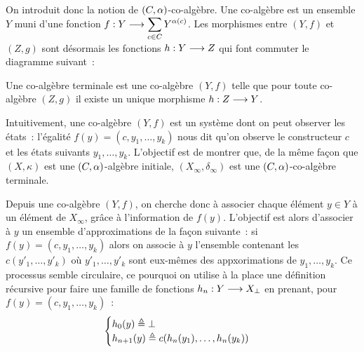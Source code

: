 \begin{problem}[La coinduction]
  On introduit donc la notion de $(C,\alpha)$-co-algèbre. Une co-algèbre est
  un ensemble $Y$ muni d'une fonction
  $f : \displaystyle Y \longrightarrow \sum_{c \in C}Y^{\alpha(c)}$. Les morphismes entre
  $(Y,f)$ et $(Z,g)$ sont désormais les fonctions $h : \displaystyle Y \longrightarrow Z$
  qui font commuter le diagramme suivant~:
  \begin{center}
  \end{center}
  Une co-algèbre terminale est une co-algèbre $(Y,f)$ telle que pour toute
  co-algèbre $(Z,g)$ il existe un unique morphisme $h : \displaystyle Z \longrightarrow Y$.

  Intuitivement, une co-algèbre $(Y,f)$ est un système dont on peut observer les
  états~: l'égalité $f(y) = (c,y_1,\ldots,y_k)$ nous dit qu'on observe le
  constructeur $c$ et les états suivants $y_1,\ldots,y_k$. L'objectif est de
  montrer que, de la même façon que $(X,\kappa)$ est une $(C,\alpha)$-algèbre
  initiale, $(X_\infty,\delta_\infty)$ est une $(C,\alpha)$-co-algèbre terminale.

  Depuis une co-algèbre $(Y,f)$, on cherche donc à associer chaque élément
  $y\in Y$ à un élément de $X_\infty$, grâce à l'information de $f(y)$.
  L'objectif est alors d'associer à $y$ un ensemble d'approximations de la façon
  suivante~: si $f(y) = (c,y_1,\ldots,y_k)$ alors on associe à $y$ l'ensemble
  contenant les $c(y'_1,\ldots,y'_k)$ où $y'_1,\ldots,y'_k$ sont eux-mêmes des
  appxorimations de $y_1,\ldots,y_k$. Ce processus semble circulaire, ce
  pourquoi on utilise à la place une définition récursive pour faire une
  famille de fonctions $h_n : \displaystyle Y \longrightarrow X_\bot$ en prenant, pour
  $f(y) = (c,y_1,\ldots,y_k)$~:
  \[\begin{cases}
  h_0(y) \triangleq \bot\\
  h_{n+1}(y) \triangleq c(h_n(y_1),\ldots,h_n(y_k))
  \end{cases}\]
  

\end{problem}
